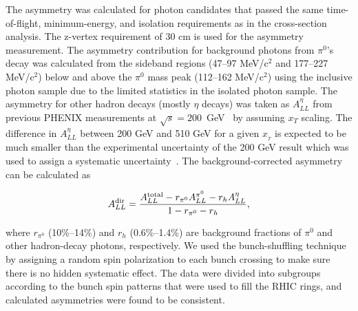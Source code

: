 \documentclass[twocolumn,letterpaper,aps,prl,longbibliography,superscriptaddress,floatfix]{revtex4-2}
\newcommand{\pizero}{\mbox{$\pi^0$}\xspace}
\begin{document}
The asymmetry was calculated for photon candidates that passed the same 
time-of-flight, minimum-energy, and isolation requirements as in the 
cross-section analysis. The z-vertex requirement of 30 cm is used for 
the asymmetry measurement. The asymmetry contribution for background 
photons from \pizero's decay was calculated from the sideband regions 
(47--97 MeV/c$^2$ and 177--227 MeV/c$^2$) below and above the \pizero 
mass peak (112--162 MeV/c$^2$) using the inclusive photon sample due to 
the limited statistics in the isolated photon sample. The asymmetry for 
other hadron decays (mostly $\eta$ decays) was taken as $A_{LL}^{\eta}$ 
from previous PHENIX measurements at 
$\sqrt{s}=200$~GeV~\cite{PhysRevD.90.012007} by assuming $x_T$ scaling. 
The difference in $A^{\eta}_{LL}$ between 200 GeV and 510 GeV for a 
given $x_{_{T}}$ is expected to be much smaller than the experimental 
uncertainty of the 200 GeV result which was used to assign a systematic 
uncertainty~\cite{PhysRevLett.113.012001, 2014276}. The 
background-corrected asymmetry can be calculated as

\begin{equation} \label{eq:all-dir}
A_{LL}^{{\rm dir}} = \frac{A_{LL}^{{\rm total}} - r_{\pi^0}A_{LL}^{\pi^0} -r_h A_{LL}^{\eta}}{1 - r_{\pi^0} - r_h},
\end{equation}

where $r_{\pi^0}$ (10\%--14\%) and $r_h$ (0.6\%--1.4\%) are background 
fractions of \pizero and other hadron-decay photons, respectively. We 
used the bunch-shuffling technique by assigning a random spin 
polarization to each bunch crossing to make sure there is no hidden 
systematic effect. The data were divided into subgroups according to the 
bunch spin patterns that were used to fill the RHIC rings, and 
calculated asymmetries were found to be consistent.
\end{document}
